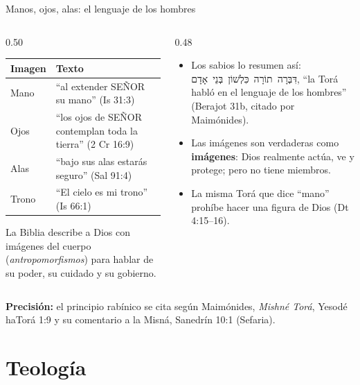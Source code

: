 \documentclass[hyperref={bookmarks=false},aspectratio=169]{beamer}
\newcommand{\heb}[1]{\mbox{\foreignlanguage{hebrew}{#1}}}
\newcommand{\SENOR}{S{\fontsize{0.78em}{1em}\selectfont EÑOR}}
\newcommand{\destacar}[1]{\textbf{\textcolor{azul}{#1}}}
\newcommand{\precision}[1]{{\footnotesize\color{gris}\textbf{Precisión:} #1}}
\begin{document}
\begin{frame}{Manos, ojos, alas: el lenguaje de los hombres}
\begin{columns}[t,onlytextwidth]
\begin{column}{0.50\textwidth}\scriptsize\renewcommand{\arraystretch}{1.15}
\begin{tabular}{@{}>{\RaggedRight\arraybackslash}p{1.7cm}>{\RaggedRight\arraybackslash}p{3.9cm}@{}}
\toprule
\textbf{Imagen} & \textbf{Texto} \\ \midrule
Mano & ``al extender \SENOR{} su mano'' (Is 31:3) \\
Ojos & ``los ojos de \SENOR{} contemplan toda la tierra'' (2 Cr 16:9) \\
Alas & ``bajo sus alas estarás seguro'' (Sal 91:4) \\
Trono & ``El cielo es mi trono'' (Is 66:1) \\
\bottomrule
\end{tabular}\par\smallskip
\small La Biblia describe a Dios con imágenes del cuerpo (\emph{antropomorfismos}) para hablar de su poder, su cuidado y su gobierno.
\end{column}
\begin{column}{0.48\textwidth}\small
\begin{itemize}
\item Los sabios lo resumen así: \heb{דִּבְּרָה תוֹרָה כִּלְשׁוֹן בְּנֵי אָדָם}, ``la Torá habló en el lenguaje de los hombres'' (Berajot 31b, citado por Maimónides).
\item Las imágenes son verdaderas como \destacar{imágenes}: Dios realmente actúa, ve y protege; pero no tiene miembros.
\item La misma Torá que dice ``mano'' prohíbe hacer una figura de Dios (Dt 4:15--16).
\end{itemize}
\end{column}
\end{columns}\par\smallskip
\precision{el principio rabínico se cita según Maimónides, \emph{Mishné Torá}, Yesodé haTorá 1:9 y su comentario a la Misná, Sanedrín 10:1 (Sefaria).}
\end{frame}

\section{Teología}
\end{document}
